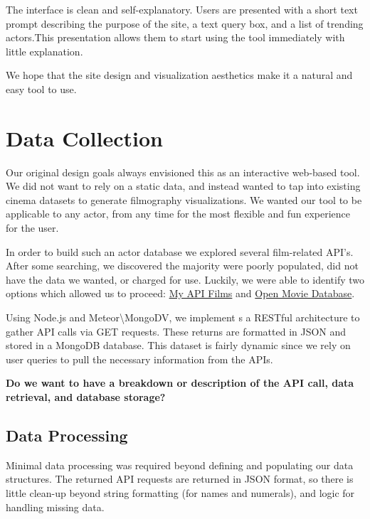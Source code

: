 \documentclass[12pt]{article}
\begin{document}
The interface is clean and self-explanatory.  
Users are presented with a short text prompt describing the purpose of the site, a text query box, and a list of trending actors.This presentation allows them to start using the tool immediately with little explanation.

We hope that the site design and visualization aesthetics make it a natural and easy tool to use.
\newpage 

\section{Data Collection}

Our original design goals always envisioned this as an interactive web-based tool.  We did not want to rely on a static data, and instead wanted to tap into existing cinema datasets to generate filmography visualizations.  We wanted our tool to be applicable to any actor, from any time for the most flexible and fun experience for the user. 

	In order to build such an actor database we explored several film-related API's.  After some searching, we discovered the majority were poorly populated, did not have the data we wanted, or charged for use.  Luckily, we were able to identify two options which allowed us to proceed: \href{http://api.myapifilms.com/index.do}{My API Films} and \href{http://www.omdbapi.com/}{Open Movie Database}. 
	
	Using Node.js and Meteor\textbackslash MongoDV, we implement s a RESTful architecture to gather API calls via GET requests. These returns are formatted in JSON and stored in a MongoDB database. This dataset is fairly dynamic since we rely on user queries to pull the necessary information from the APIs.

	
	\begin{center}
	\color{blue}
	\textbf{Do we want to have a breakdown or description of the API call, data retrieval, and database storage? }
	\end{center}
	
\subsection{Data Processing}
	Minimal data processing was required beyond defining and populating our data structures.  The returned API requests are returned in JSON format, so there is little clean-up beyond string formatting (for names and numerals), and logic for handling missing data.  
	
\end{document}
